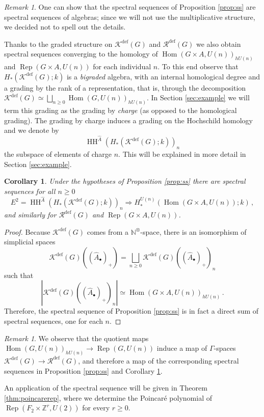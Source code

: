 \documentclass[oneside, a4paper, 12pt]{article}
\numberwithin{equation}{section}
\DeclareMathOperator{\Rep}{Rep}
\DeclareMathOperator{\Hom}{Hom}
\DeclareMathOperator{\HH}{HH}
\newcommand{\Kdef}{\mathcal{K}^{\mathrm{def}}}
\newcommand{\Rdef}{\mathcal{R}^{\mathrm{def}}}
\newcommand{\Z}{\mathbb{Z}}
\newcommand{\N}{\mathbb{N}}
\theoremstyle{plain}
\newtheorem{corollary}[theorem]{Corollary}
\theoremstyle{definition}
\theoremstyle{remark}
\newtheorem{remark}[theorem]{Remark}
\begin{document}
\begin{remark}
One can show that the spectral sequences of Proposition \ref{prop:ss} are spectral sequences of algebras; since we will not use the multiplicative structure, we decided not to spell out the details. 
\end{remark}

Thanks to the graded structure on $\Kdef(G)$ and $\Rdef(G)$ we also obtain spectral sequences converging to the homology of $\Hom(G\times A,U(n))_{hU(n)}$ and $\Rep(G\times A,U(n))$ for each individual $n$. To this end observe that $H_\ast(\Kdef(G);k)$ is a \emph{bigraded} algebra, with an internal homological degree and a grading by the rank of a representation, that is, through the decomposition $\Kdef(G)\simeq \bigsqcup_{n\geq 0} \Hom(G,U(n))_{hU(n)}$. In Section \ref{sec:example} we will term this grading as the grading by \emph{charge} (as opposed to the homological grading). The grading by charge induces a grading on the Hochschild homology and we denote by
\[
\HH^{\widehat{A}}(H_\ast(\Kdef(G);k))_n
\]
the subspace of elements of charge $n$. This will be explained in more detail in Section \ref{sec:example}.


\begin{corollary} \label{cor:ss}
Under the hypotheses of Proposition \ref{prop:ss} there are spectral sequences for all $n\geq 0$
\[
E^2=\HH^{\widehat{A}}(H_\ast(\Kdef(G);k))_n \Longrightarrow H_\ast^{U(n)}(\Hom(G\times A,U(n));k)\,,
\]
and similarly for $\Rdef(G)$ and $\Rep(G\times A,U(n))$.
\end{corollary}
\begin{proof}
Because $\Kdef(G)$ comes from a $\N^\otimes$-space, there is an isomorphism of simplicial spaces
\[
\Kdef(G)((\widehat{A}_\bullet)_+) = \bigsqcup_{n\geq 0} \Kdef(G)((\widehat{A}_\bullet)_+)_n
\]
such that
\[
|\Kdef(G)((\widehat{A}_\bullet)_+)_n| \simeq \Hom(G\times A,U(n))_{hU(n)}\,.
\]
Therefore, the spectral sequence of Proposition \ref{prop:ss} is in fact a direct sum of spectral sequences, one for each $n$.
\end{proof}

\begin{remark} \label{rem:naturality}
We observe that the quotient maps $\Hom(G,U(n))_{hU(n)} \to \Rep(G,U(n))$ induce a map of $\Gamma$-spaces $\Kdef(G)\to \Rdef(G)$, and therefore a map of the corresponding spectral sequences in Proposition \ref{prop:ss} and Corollary \ref{cor:ss}. 
\end{remark}

An application of the spectral sequence will be given in Theorem \ref{thm:poincarerep}, where we determine the Poincar{\'e} polynomial of $\Rep(F_2\times \Z^r,U(2))$ for every $r\geq 0$.
\end{document}
